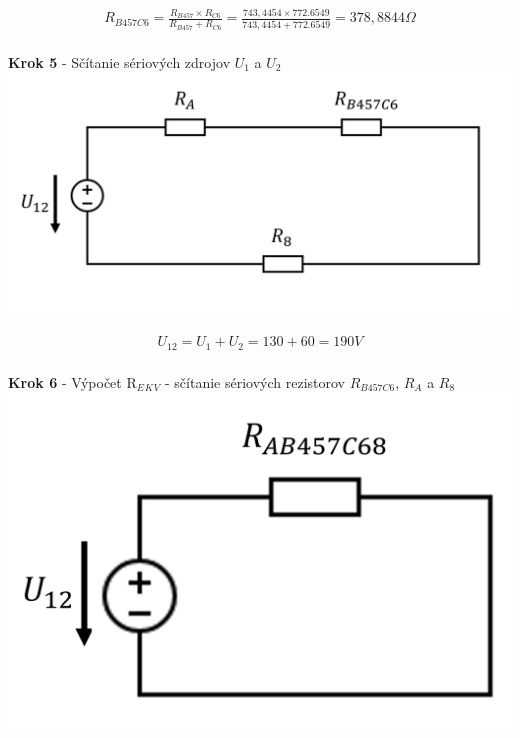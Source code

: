 \begin{gather*}
    R_{B457C6} = \frac{R_{B457} \times R_{C6}}{R_{B457} + R_{C6}} =
    \frac{743,4454 \times 772.6549}{743,4454 +772.6549} =
    378,8844 \Omega \\
\end{gather*}

\begin{center}
\textbf{Krok 5} - Sčítanie sériových zdrojov $U_1$ a $U_2$
\includegraphics[scale=0.7,keepaspectratio]{fig/c5.png} \\
\end{center}

\begin{gather*}
   U_{12} = U_{1} + U_{2} = 130 + 60 = 190 V \\
\end{gather*}

\begin{center}
\textbf{Krok 6} - Výpočet R$_E$$_K$$_V$ - sčítanie sériových rezistorov $R_{B457C6}$, $R_A$ a $R_8$
\\
\includegraphics[scale=0.8,keepaspectratio]{fig/c6.png} \\
\end{center}

